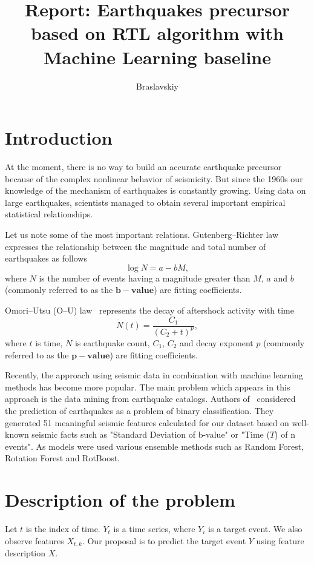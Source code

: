 \documentclass[12pt]{article}
\let\vec=\mathbf
\begin{document}
\title{Report: Earthquakes precursor based on RTL algorithm with Machine Learning baseline}
\author{Braslavskiy}

\maketitle 
\section{Introduction}
At the moment, there is no way to build an accurate earthquake precursor because of the complex nonlinear behavior of seismicity. But since the 1960s our knowledge of the mechanism of earthquakes is constantly growing. Using data on large earthquakes, scientists managed to obtain several important empirical statistical relationships. 

Let us note some of the most important relations. Gutenberg–Richter law~\cite{b-value} expresses the relationship between the magnitude and total number of earthquakes as follows  
\begin{equation}
	\log{N}= a-bM,
\end{equation}
where $N$ is the number of events having a magnitude greater than $M$, $a$ and $b$ (commonly referred to as the $\vec{b-value}$) are fitting coefficients.

Omori–Utsu (O–U) law~\cite{O-U law} represents the decay of aftershock activity with time  
\begin{equation}
	\dot{N}(t)=\frac{C_1}{(C_2+t)^p},
\end{equation}
where $t$ is time, $N$ is earthquake count, $C_1$, $C_2$ and decay exponent $p$ (commonly referred to as the $\vec{p-value}$) are fitting coefficients.

Recently, the approach using seismic data in combination with machine learning methods has become more popular. The main problem which appears in this approach is the data mining from earthquake catalogs. 
Authors of~\cite{treebased} considered the prediction of earthquakes as a problem of binary classification. They generated 51 meaningful seismic features calculated for our dataset based on well-known seismic facts such as "Standard Deviation of b-value" or "Time ($T$) of n events". As models were used various ensemble methods such as Random Forest, Rotation Forest and RotBoost. 



\section{Description of the problem}
Let $t$ is the index of time. $Y_t$ is a time series, where $Y_i$ is a target event. We also observe features $X_{t,k}$. Our proposal is to predict the target event $Y$ using feature description $X$. 
\end{document}
